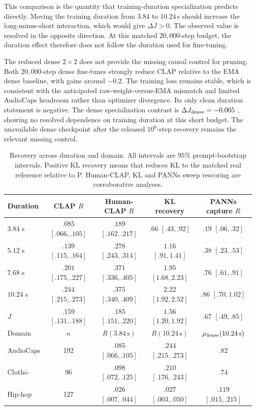 This comparison is the quantity that training-duration specialization predicts directly. Moving the training duration from $3.84$ to $10.24$\,s should increase the long-minus-short interaction, which would give $\Delta J>0$. The observed value is resolved in the opposite direction. At this matched $20{,}000$-step budget, the duration effect therefore does not follow the duration used for fine-tuning.

The reduced dense $2\times2$ does not provide the missing causal control for pruning. Both $20{,}000$-step dense fine-tunes strongly reduce CLAP relative to the EMA dense baseline, with gains around $-0.2$. The training loss remains stable, which is consistent with the anticipated raw-weight-versus-EMA mismatch and limited AudioCaps headroom rather than optimizer divergence. Its only clean duration statement is negative. The dense specialization contrast is $\Delta J_{\rm dense}=-0.005$ , showing no resolved dependence on training duration at this short budget. The unavailable dense checkpoint after the released $10^{6}$-step recovery remains the relevant missing control.

\begin{table}[t]
\centering
\caption{Recovery across duration and domain. All intervals are $95\%$ prompt-bootstrap intervals. Positive KL recovery means that \PFT{} reduces KL to the matched real reference relative to P. Human-CLAP, KL and PANNs sweep rescoring are corroborative analyses.}
\label{tab:evidence}
\setlength{\tabcolsep}{4.0pt}
\begin{tabular}{@{}lcccc@{}}
\toprule
Duration & CLAP $R$ & Human-CLAP $R$ & KL recovery & PANNs capture $R$ \\
\midrule
$3.84$ s & $.085$ $[.066,.105]$ & $.189$ $[.162,.217]$ & $.66$ $[.43,.92]$ & $.19$ $[.06,.32]$ \\
$5.12$ s & $.139$ $[.115,.164]$ & $.278$ $[.243,.314]$ & $1.16$ $[.91,1.41]$ & $.38$ $[.23,.53]$ \\
$7.68$ s & $.201$ $[.175,.227]$ & $.371$ $[.336,.405]$ & $1.95$ $[1.68,2.23]$ & $.76$ $[.61,.91]$ \\
$10.24$ s & $.244$ $[.215,.273]$ & $.375$ $[.340,.409]$ & $2.22$ $[1.92,2.52]$ & $.86$ $[.70,1.02]$ \\
$J$ & $.159$ $[.131,.188]$ & $.185$ $[.151,.220]$ & $1.56$ $[1.20,1.92]$ & $.67$ $[.49,.85]$ \\
\midrule
Domain & $n$ & $R(3.84\,\mathrm{s})$ & $R(10.24\,\mathrm{s})$ & $\rho_{\rm dense}(10.24\,\mathrm{s})$ \\
\midrule
AudioCaps & 192 & $.085$ $[.066,.105]$ & $.244$ $[.215,.273]$ & $.82$ \\
Clotho & 96 & $.098$ $[.072,.125]$ & $.210$ $[.176,.243]$ & $.74$ \\
Hip-hop & 127 & $.026$ $[.007,.044]$ & $.027$ $[.003,.050]$ & $.119$ $[.015,.215]$ \\
\bottomrule
\end{tabular}
\end{table}


